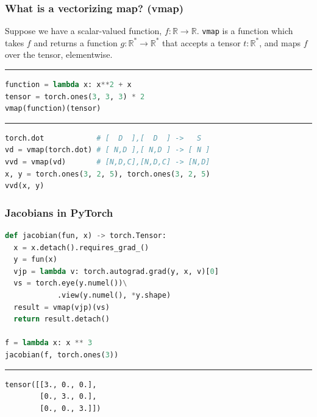 \documentclass{beamer}
\begin{document}
    \begin{frame}[fragile]
        \frametitle{What is a vectorizing map? (vmap)}

        Suppose we have a scalar-valued function, $f: \mathbb{R}\rightarrow\mathbb{R}$. \texttt{vmap} is a function
        which takes $f$ and returns a function $g: \mathbb{R}^{*}\rightarrow\mathbb{R}^{*}$ that accepts a tensor $t: \mathbb{R}^{*}$, and maps $f$ over the tensor, elementwise.
        \noindent\rule{\textwidth}{0.5pt}

        \begin{lstlisting}[language=Python]
function = lambda x: x**2 + x
tensor = torch.ones(3, 3, 3) * 2
vmap(function)(tensor)
        \end{lstlisting}

        \noindent\rule{\textwidth}{0.5pt}
        \begin{lstlisting}[language=Python, linewidth=1.1\linewidth]
torch.dot            # [  D  ],[  D  ] ->   S
vd = vmap(torch.dot) # [ N,D ],[ N,D ] -> [ N ]
vvd = vmap(vd)       # [N,D,C],[N,D,C] -> [N,D]
x, y = torch.ones(3, 2, 5), torch.ones(3, 2, 5)
vvd(x, y)
        \end{lstlisting}

    \end{frame}


    \begin{frame}[fragile]
        \frametitle{Jacobians in PyTorch}
        \begin{lstlisting}[language=Python, linewidth=1.1\linewidth]
def jacobian(fun, x) -> torch.Tensor:
  x = x.detach().requires_grad_()
  y = fun(x)
  vjp = lambda v: torch.autograd.grad(y, x, v)[0]
  vs = torch.eye(y.numel())\
            .view(y.numel(), *y.shape)
  result = vmap(vjp)(vs)
  return result.detach()

f = lambda x: x ** 3
jacobian(f, torch.ones(3))
        \end{lstlisting}

        \noindent\rule{1.03\textwidth}{0.5pt}

        \begin{lstlisting}
tensor([[3., 0., 0.],
        [0., 3., 0.],
        [0., 0., 3.]])
        \end{lstlisting}
    \end{frame}
\end{document}
